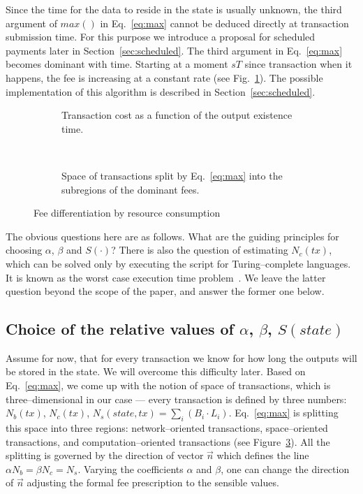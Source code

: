 \documentclass[]{llncs}   %
\begin{document}
Since the time for the data to reside in the state is usually unknown,
the third argument of $max()$ in Eq.~\eqref{eq:max} cannot be deduced directly at
transaction submission time. For this purpose we introduce a proposal for 
scheduled payments later in Section~\ref{sec:scheduled}. The third
argument in Eq.~\eqref{eq:max} becomes dominant with time. Starting at a moment $sT$ since transaction when it happens, the
fee is increasing at a constant rate (see Fig.~\ref{fig:max_t}). The possible implementation of this 
algorithm is described in Section~\ref{sec:scheduled}.
\begin{figure}[h]
    \centering
    \begin{subfigure}[b]{.45\textwidth}
    
    \caption{Transaction cost as a function of the output existence time.
        \newline
        \label{fig:max_t}}
    \end{subfigure}
    ~
    \begin{subfigure}[b]{.45\textwidth}
        
        \caption{Space of transactions split by
            Eq.~\eqref{eq:max} into the subregions of the dominant fees.
            \label{fig:max}}
        \end{subfigure}
        \caption{Fee differentiation by resource consumption}
\end{figure}

The obvious questions here are as follows. What are the guiding principles for
choosing $\alpha$, $\beta$ and $S(\cdot)$? There is also the
question of estimating $N_c(tx)$, which can be solved only by executing the
script for Turing--complete languages. It is known as the worst case execution
time problem~\cite{Wilhelm2008}.  We leave the latter question beyond the scope of
the paper, and answer the former one below.

\subsection{Choice of the relative values of $\alpha$, $\beta$, $S(state)$}

Assume for now, that for every transaction we know for how long the outputs will be
stored in the state. We will overcome this difficulty later. Based on
Eq.~\eqref{eq:max}, we come up with the notion of space of transactions, which
is three--dimensional in our case --- every transaction is defined by three
numbers: $N_b(tx)$, $N_c(tx)$, $N_s(state,tx) = \sum_i (B_i \cdot L_i)$. Eq.~\eqref{eq:max} is splitting 
this space into three regions: network--oriented transactions, space--oriented transactions, 
and computation--oriented transactions (see Figure~\ref{fig:max}). All the splitting 
is governed by the direction of vector $\vec{n}$ which defines the line $\alpha N_b=\beta N_c=N_s$.
Varying the coefficients $\alpha$ and $\beta$, one can change the direction of
$\vec{n}$ adjusting the formal fee prescription to the sensible values.
\end{document}
